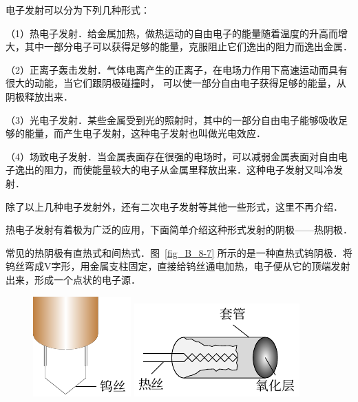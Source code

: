 电子发射可以分为下列几种形式：

（1）热电子发射．给金属加热，做热运动的自由电子的能量随着温度的升高而增大，其中一部分电子可以获得足够的能量，克服阻止它们逸出的阻力而逸出金属．

（2）正离子轰击发射．气体电离产生的正离子，在电场力作用下高速运动而具有很大的动能，当它们跟阴极碰撞时，
可以使一部分自由电子获得足够的能量，从阴极释放出来．

（3）光电子发射．某些金属受到光的照射时，其中的一部分自由电子能够吸收足够的能量，而产生电子发射，这种电子发射也叫做光电效应．

（4）场致电子发射．当金属表面存在很强的电场时，可以减弱金属表面对自由电子逸出的阻力，而使能量较大的电子从金属里释放出来．这种电子发射又叫冷发射．

除了以上几种电子发射外，还有二次电子发射等其他一些形式，这里不再介绍．

热电子发射有着极为广泛的应用，下面简单介绍这种形式发射的阴极——热阴极．

常见的热阴极有直热式和间热式．图~\ref{fig_B_8-7} 所示的是一种直热式钨阴极．将钨丝弯成V字形，用金属支柱固定，直接给钨丝通电加热，电子便从它的顶端发射出来，形成一个点状的电子源．
\begin{figure}[htbp]
    \centering
    \begin{minipage}[t]{0.48\textwidth}
        \centering
        \includegraphics{fig/B/8-7.pdf}
        \caption{}\label{fig_B_8-7}
    \end{minipage}
    \begin{minipage}[t]{0.48\textwidth}
        \centering
        \includegraphics{fig/B/8-8.pdf}
        \caption{}\label{fig_B_8-8}
    \end{minipage}
\end{figure}

